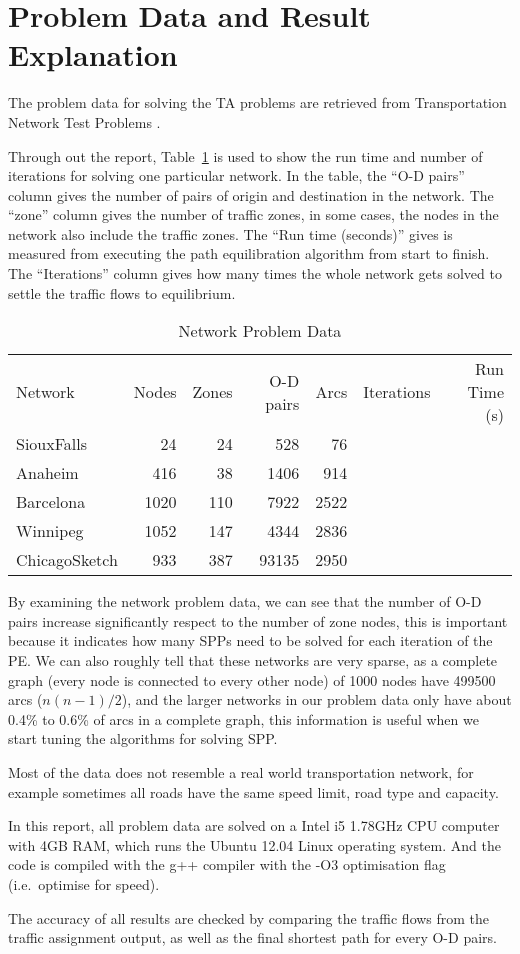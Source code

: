\section{Problem Data and Result Explanation}
The problem data for solving the TA problems are retrieved from Transportation Network Test Problems \citep{ProblemData}.

Through out the report, Table~\ref{table:problemdata} is used to show the run time and number of iterations for solving one particular network.
In the table, the ``O-D pairs'' column gives the number of pairs of origin and destination in the network.
The ``zone'' column gives the number of traffic zones,
in some cases, the nodes in the network also include the traffic zones.
The ``Run time (seconds)'' gives is measured from executing the 
path equilibration algorithm from start to finish.
The ``Iterations'' column gives how many times the whole network
gets solved to settle the traffic flows to equilibrium.
\begin{table}[H]
    \centering
    \begin{tabular}{lrrrrrr}
        Network & Nodes & Zones & O-D pairs & Arcs & Iterations & Run Time (s) \\
        SiouxFalls    & 24   & 24  & 528   & 76   \\
        Anaheim       & 416  & 38  & 1406  & 914  \\
        Barcelona     & 1020 & 110 & 7922  & 2522 \\
        Winnipeg      & 1052 & 147 & 4344  & 2836 \\
        ChicagoSketch & 933  & 387 & 93135 & 2950 
    \end{tabular}
    \caption{Network Problem Data}
    \label{table:problemdata}
\end{table}
By examining the network problem data,
we can see that the number of O-D pairs increase
significantly respect to the number of zone nodes,
this is important because it indicates how many SPPs need to be solved for each iteration of the PE.
We can also roughly tell that these networks are very sparse,
as a complete graph (every node is connected to every other node) of 1000 nodes have 499500 arcs ($n(n-1)/2$),
and the larger networks in our problem data only have about 0.4\% to 0.6\% of arcs in a complete graph, this information is useful
when we start tuning the algorithms for solving SPP.

Most of the data does not resemble a real world transportation network, 
for example sometimes all roads have the same speed limit, road type and capacity.

In this report, all problem data are solved on a Intel i5 1.78GHz CPU computer with 4GB RAM, which runs the Ubuntu 12.04 Linux operating system.
And the code is compiled with the g++ compiler with the -O3 optimisation flag (i.e.\ optimise for speed).

The accuracy of all results are checked by comparing the traffic flows from the traffic assignment output,
as well as the final shortest path for every O-D pairs.

